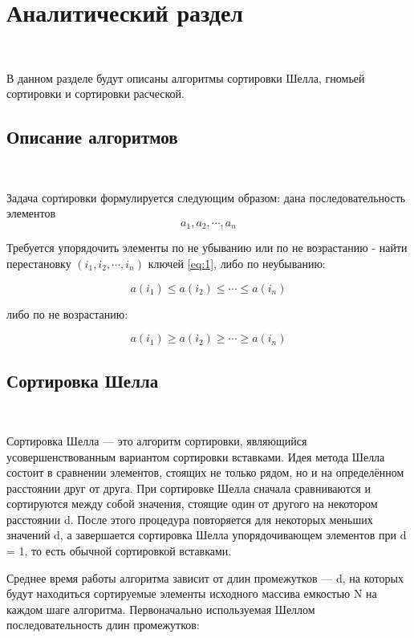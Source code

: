 \documentclass[12pt]{report}
\begin{document}
	\chapter{Аналитический раздел}
	
	~\
	
	В данном разделе будут описаны алгоритмы сортировки Шелла, гномьей сортировки и сортировки расческой.
	
	\section{Описание алгоритмов}
	
	~\
	
	Задача сортировки формулируется следующим образом: дана последовательность элементов
	\begin{equation}\label{eq:1}
		a_{1}, a_{2},\cdots, a_{n}
	\end{equation}
	
	Требуется упорядочить элементы по не убыванию или по не возрастанию - найти перестановку $(i_{1}, i_{2}, \cdots, i_{n})$ ключей \ref{eq:1}, либо по неубыванию:
	
	\begin{equation}\label{eq:2}
	a(i_{1}) \leq a(i_{2}) \leq \cdots \leq a(i_{n})
	\end{equation}
	
	либо по не возрастанию:
	
	\begin{equation}\label{eq:3}
	a(i_{1}) \geq a(i_{2}) \geq \cdots \geq a(i_{n})
	\end{equation}
	
	\section{Сортировка Шелла}
	
	~\
	
	Сортировка Шелла — это алгоритм сортировки, являющийся усовершенствованным вариантом сортировки вставками. Идея метода Шелла состоит в сравнении элементов, стоящих не только рядом, но и на определённом расстоянии друг от друга. При сортировке Шелла сначала сравниваются и сортируются между собой значения, стоящие один от другого на
	некотором расстоянии d. После этого процедура повторяется для некоторых
	меньших значений d, а завершается сортировка Шелла упорядочивающем
	элементов при d = 1, то есть обычной сортировкой вставками.
	
	Среднее время работы алгоритма зависит от длин промежутков — d, на
	которых будут находиться сортируемые элементы исходного массива емкостью N на каждом шаге алгоритма. Первоначально используемая Шеллом
	последовательность длин промежутков:
	
\end{document}
